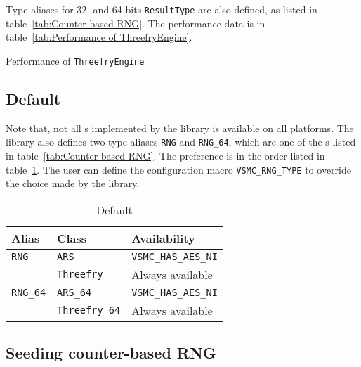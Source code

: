 Type aliases for 32- and 64-bits \verb|ResultType| are also defined, as listed
in table~\ref{tab:Counter-based RNG}. The performance data is in
table~\ref{tab:Performance of ThreefryEngine}.

\begin{table}
  \caption{Performance of \protect\texttt{ThreefryEngine}}
  \label{tab:Performance of ThreefryEngine}
\end{table}

\subsection{Default \protect\rng}
\label{sub:Default RNG}

Note that, not all \rng{}s implemented by the library is available on all
platforms. The library also defines two type aliases \verb|RNG| and
\verb|RNG_64|, which are one of the \rng{}s listed in
table~\ref{tab:Counter-based RNG}. The preference is in the order listed in
table~\ref{tab:Default RNG}. The user can define the configuration macro
\verb|VSMC_RNG_TYPE| to override the choice made by the library.

\begin{table}
  \begin{tabularx}{\textwidth}{XXX}
    \toprule
    Alias  & Class & Availability \\
    \midrule
    \verb|RNG|    & \verb|ARS|         & \verb|VSMC_HAS_AES_NI| \\
                  & \verb|Threefry|    & Always available       \\
    \verb|RNG_64| & \verb|ARS_64|      & \verb|VSMC_HAS_AES_NI| \\
                  & \verb|Threefry_64| & Always available       \\
    \bottomrule
  \end{tabularx}
  \caption{Default \protect\rng}
  \label{tab:Default RNG}
\end{table}

\subsection{Seeding counter-based RNG}
\label{sub:Seeding counter-based RNG}

